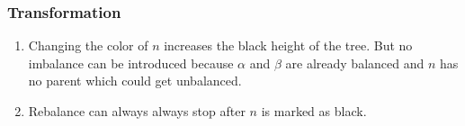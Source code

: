 \documentclass[a4paper,10pt,twoside]{article}
\begin{document}
\subsubsection{Transformation}

\begin{enumerate}
\item Changing the color of $n$ increases the black height of the tree. But
no imbalance can be introduced because $\alpha$ and $\beta$ are already balanced
and $n$ has no parent which could get unbalanced.

\begin{center}
\end{center}


\item Rebalance can always always stop after $n$ is marked as black.

\end{enumerate}
\end{document}
